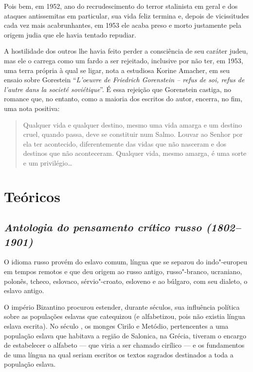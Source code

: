 Pois bem, em 1952, ano do recrudescimento do terror stalinista em geral
e dos ataques antissemitas em particular, sua vida feliz termina e,
depois de vicissitudes cada vez mais acabrunhantes, em 1953 ele acaba
preso e morto justamente pela origem judia que ele havia tentado
repudiar.

A hostilidade dos outros lhe havia feito perder a consciência de seu
caráter judeu, mas ele o carrega como um fardo a ser rejeitado,
inclusive por não ter, em 1953, uma terra própria à qual se ligar, nota
a estudiosa Korine Amacher, em seu ensaio sobre Gorestein ``\emph{L'oeuvre de
Friedrich Gorenstein -- refus de soi, refus de l'autre dans la societé
soviétique}''. É essa rejeição que Gorenstein castiga, no romance que, no entanto, como a maioria dos escritos do autor, encerra,
no fim, uma nota positiva: 

\begin{quote}
Qualquer vida e qualquer destino, mesmo uma
vida amarga e um destino cruel, quando passa, deve se constituir num
Salmo. Louvar ao Senhor por ela ter acontecido, diferentemente das vidas
que não nasceram e dos destinos que não aconteceram. Qualquer vida,
mesmo amarga, é uma sorte e um privilégio\ldots{}
\end{quote}

\part{Teóricos}

\chapter{\emph{Antologia do pensamento crítico russo (1802--1901)}}

O idioma russo provém do eslavo comum, língua que se separou do
indo"-europeu em tempos remotos e que deu origem ao russo antigo,
russo"-branco, ucraniano, polonês, tcheco, eslovaco, sérvio"-croato,
esloveno e ao búlgaro, com seu dialeto, o eslavo antigo.

O império Bizantino procurou estender, durante séculos, sua influência
política sobre as populações eslavas que catequizou (e alfabetizou, pois
não existia língua eslava escrita). No século , os monges Cirilo e
Metódio, pertencentes a uma população eslava que habitava a região de
Salonica, na Grécia, tiveram o encargo de estabelecer o alfabeto --- que
viria a ser chamado cirílico --- e os fundamentos de uma língua na qual
seriam escritos os textos sagrados destinados a toda a população eslava.

